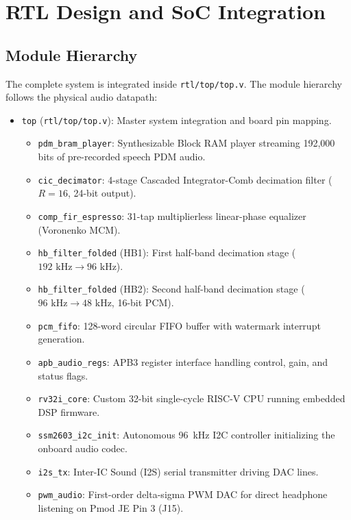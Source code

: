\documentclass[11pt,a4paper]{article}
\begin{document}
\section{RTL Design and SoC Integration}
\label{sec:rtl}

\subsection{Module Hierarchy}
The complete system is integrated inside \texttt{rtl/top/top.v}. The module hierarchy follows the physical audio datapath:
\begin{itemize}
  \item \texttt{top} (\texttt{rtl/top/top.v}): Master system integration and board pin mapping.
  \begin{itemize}
    \item \texttt{pdm\_bram\_player}: Synthesizable Block RAM player streaming 192,000 bits of pre-recorded speech PDM audio.
    \item \texttt{cic\_decimator}: 4-stage Cascaded Integrator-Comb decimation filter ($R=16$, 24-bit output).
    \item \texttt{comp\_fir\_espresso}: 31-tap multiplierless linear-phase equalizer (Voronenko MCM).
    \item \texttt{hb\_filter\_folded} (HB1): First half-band decimation stage ($192\text{ kHz} \to 96\text{ kHz}$).
    \item \texttt{hb\_filter\_folded} (HB2): Second half-band decimation stage ($96\text{ kHz} \to 48\text{ kHz}$, 16-bit PCM).
    \item \texttt{pcm\_fifo}: 128-word circular FIFO buffer with watermark interrupt generation.
    \item \texttt{apb\_audio\_regs}: APB3 register interface handling control, gain, and status flags.
    \item \texttt{rv32i\_core}: Custom 32-bit single-cycle RISC-V CPU running embedded DSP firmware.
    \item \texttt{ssm2603\_i2c\_init}: Autonomous 96~kHz I2C controller initializing the onboard audio codec.
    \item \texttt{i2s\_tx}: Inter-IC Sound (I2S) serial transmitter driving DAC lines.
    \item \texttt{pwm\_audio}: First-order delta-sigma PWM DAC for direct headphone listening on Pmod JE Pin 3 (J15).
  \end{itemize}
\end{itemize}
\end{document}
